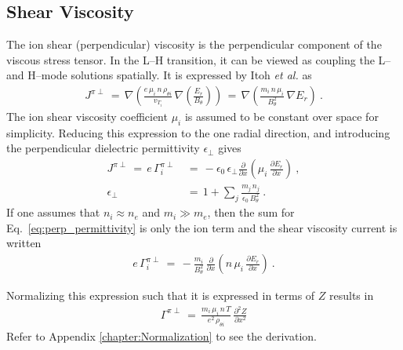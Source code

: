\subsection{Shear Viscosity}\label{ssec:shear_viscosity}
The ion shear (perpendicular) viscosity is the perpendicular component of the viscous stress tensor.
In the L--H transition, it can be viewed as coupling the L-- and H--mode solutions spatially.
It is expressed by Itoh \emph{et al.} \cite{itoh_elmy_1993} as
\begin{align} %
	J^{\pi\perp} \,=\, \nabla \left(\frac{e \, \mu_i \, n \, \rho_{\theta i}}
		{v_{T_i}} \, \nabla\left(\frac{E_r}{B_\theta}\right)\right) \,=\,
		\nabla \left(\frac{m_i \, n \, \mu_i}{B_\theta^2} \, \nabla E_r\right)~.
		\label{eq:shear_visc_current_definition}
\end{align}
The ion shear viscosity coefficient $\mu_i$ is assumed to be constant over space for simplicity.
Reducing this expression to the one radial direction, and introducing the perpendicular dielectric permittivity $\epsilon_\perp$ \cite{kiviniemi_numerical_2001} gives
\begin{align} %
	J^{\pi\perp} \,=\, e\,\Gamma_i^{\pi\perp} \,&=\,
		-\epsilon_0\,\epsilon_\perp \frac{\partial}{\partial x}
		\left(\mu_i \, \frac{\partial E_r}{\partial x}\right)~, \\
	\epsilon_\perp \,&=\, 1 + \sum_j \frac{m_j \, n_j}{\epsilon_0 \, B_\theta^2}~.
		\label{eq:perp_permittivity}
\end{align}
If one assumes that $n_i \approx n_e$ and $m_i \gg m_e$, then the sum for Eq.~\ref{eq:perp_permittivity} is only the ion term and the shear viscosity current is written
\begin{align} %
	e \, \Gamma_i^{\pi\perp} \,=\, -\frac{m_i}{B_\theta^2} \,
		\frac{\partial}{\partial x} \left(n \, \mu_i \,
		\frac{\partial E_r}{\partial x}\right)~. \label{eq:shear_current_E_r}
\end{align}

Normalizing this expression such that it is expressed in terms of $Z$ results in
\begin{align} %
	\Gamma^{\pi\perp} \,=\, \frac{m_i \, \mu_i \, n \, T}{e^2 \, \rho_{\theta i}}
		\, \frac{\partial^2 Z}{\partial x^2} \label{eq:shear_current_Z}
\end{align}
Refer to Appendix \ref{chapter:Normalization} to see the derivation.


